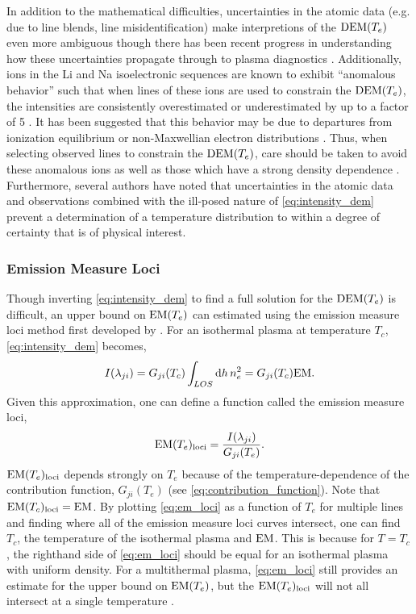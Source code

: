 In addition to the mathematical difficulties, uncertainties in the atomic data (e.g. due to line blends, line misidentification) make interpretions of the $\dem$ even more ambiguous though there has been recent progress in understanding how these uncertainties propagate through to plasma diagnostics \citep[e.g.][]{yu_incorporating_2018,del_zanna_uncertainties_2019}. Additionally, ions in the Li and Na isoelectronic sequences are known to exhibit ``anomalous behavior'' such that when lines of these ions are used to constrain the $\dem$, the intensities are consistently overestimated or underestimated by up to a factor of 5 \citep{burton_w._m._discussion_1971,dupree_analysis_1972,del_zanna_spectroscopic_2002}. It has been suggested that this behavior may be due to departures from ionization equilibrium or non-Maxwellian electron distributions \citep{del_zanna_solar_2018}. Thus, when selecting observed lines to constrain the $\dem$, care should be taken to avoid these anomalous ions as well as those which have a strong density dependence \citep[e.g. Fe IX][]{del_zanna_solar_2018}. Furthermore, several authors \citep{craig_fundamental_1976,judge_failure_1995,judge_fundamental_1997,judge_coronal_2010} have noted that uncertainties in the atomic data and observations combined with the ill-posed nature of \autoref{eq:intensity_dem} prevent a determination of a temperature distribution to within a degree of certainty that is of physical interest.

\subsubsection{Emission Measure Loci}

Though inverting \autoref{eq:intensity_dem} to find a full solution for the $\dem$ is difficult, an upper bound on $\emd$ can estimated using the emission measure loci method first developed by \citet{veck_solar_1981}. For an isothermal plasma at temperature $T_c$, \autoref{eq:intensity_dem} becomes,
\begin{equation}
    I(\lambda_{ji}) = G_{ji}(T_c)\int_{LOS}\dd{h}n_e^2 = G_{ji}(T_c)\textup{EM}.
\end{equation}
Given this approximation, one can define a function called the emission measure loci,
\begin{equation}\label{eq:em_loci}
    \emd_{\textup{loci}} = \frac{I(\lambda_{ji})}{G_{ji}(T_e)}.
\end{equation}
$\emd_{\textup{loci}}$ depends strongly on $T_e$ because of the temperature-dependence of the contribution function, $G_{ji}(T_e)$ (see \autoref{eq:contribution_function}). Note that $\emd[T_c]_{\textup{loci}}=\textup{EM}$. By plotting \autoref{eq:em_loci} as a function of $T_e$ for multiple lines and finding where all of the emission measure loci curves intersect, one can find $T_c$, the temperature of the isothermal plasma and $\textup{EM}$. This is because for $T=T_c$, the righthand side of \autoref{eq:em_loci} should be equal for an isothermal plasma with uniform density. For a multithermal plasma, \autoref{eq:em_loci} still provides an estimate for the upper bound on $\emd$, but the $\emd_{\textup{loci}}$ will not all intersect at a single temperature \citep{phillips_ultraviolet_2008}.

